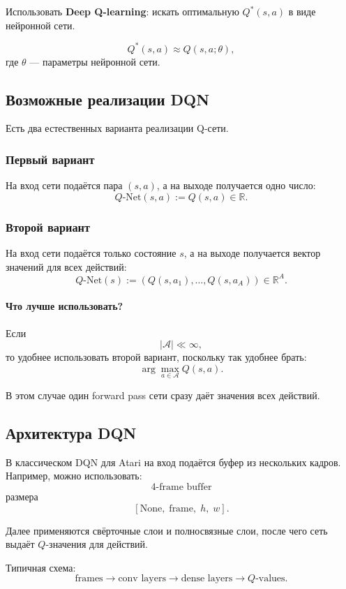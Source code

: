 \documentclass[12pt,a4paper]{article}
\begin{document}
Использовать \textbf{Deep Q-learning}: искать оптимальную $Q^\ast(s,a)$ в виде нейронной сети.

\[
Q^\ast(s,a)
\approx
Q(s,a;\theta),
\]
где $\theta$ --- параметры нейронной сети.

\subsection{Возможные реализации DQN}

Есть два естественных варианта реализации Q-сети.

\subsubsection{Первый вариант}

На вход сети подаётся пара $(s,a)$, а на выходе получается одно число:
\[
Q\text{-Net}(s,a)
:=
Q(s,a)
\in
\mathbb R.
\]

\subsubsection{Второй вариант}

На вход сети подаётся только состояние $s$, а на выходе получается вектор значений для всех действий:
\[
Q\text{-Net}(s)
:=
\left(
Q(s,a_1),
\ldots,
Q(s,a_A)
\right)
\in
\mathbb R^A.
\]

\paragraph{Что лучше использовать?}

Если
\[
|\mathcal A| \ll \infty,
\]
то удобнее использовать второй вариант, поскольку так удобнее брать:
\[
\arg\max_{a \in \mathcal A}
Q(s,a).
\]

В этом случае один forward pass сети сразу даёт значения всех действий.

\subsection{Архитектура DQN}

В классическом DQN для Atari на вход подаётся буфер из нескольких кадров. Например, можно использовать:
\[
4\text{-frame buffer}
\]
размера
\[
[\text{None},\; \text{frame},\; h,\; w].
\]

Далее применяются свёрточные слои и полносвязные слои, после чего сеть выдаёт $Q$-значения для действий.

Типичная схема:
\[
\text{frames}
\longrightarrow
\text{conv layers}
\longrightarrow
\text{dense layers}
\longrightarrow
Q\text{-values}.
\]
\end{document}

